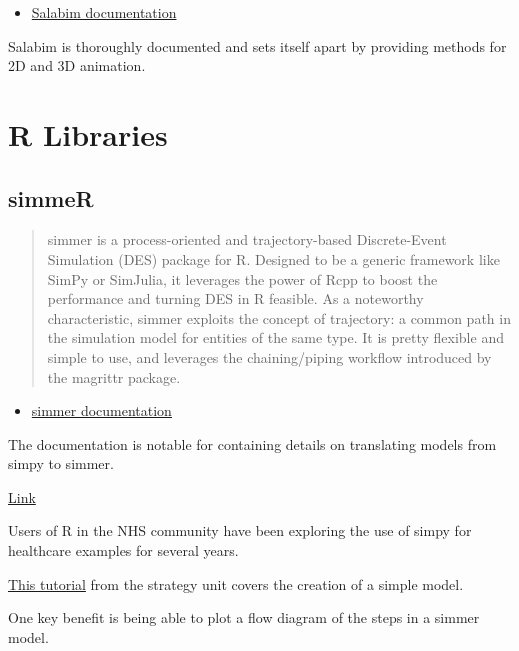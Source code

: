 \documentclass[
  letterpaper,
  DIV=11,
  numbers=noendperiod]{scrreprt}
\providecommand{\tightlist}{%
  \setlength{\itemsep}{0pt}\setlength{\parskip}{0pt}}\usepackage{longtable,booktabs,array}
\begin{document}
\begin{itemize}
\tightlist
\item
  \href{https://www.salabim.org/manual/Overview.html}{Salabim
  documentation}
\end{itemize}

Salabim is thoroughly documented and sets itself apart by providing
methods for 2D and 3D animation.

\section{R Libraries}\label{r-libraries}

\subsection{simmeR}\label{simmer}

\begin{quote}
simmer is a process-oriented and trajectory-based Discrete-Event
Simulation (DES) package for R. Designed to be a generic framework like
SimPy or SimJulia, it leverages the power of Rcpp to boost the
performance and turning DES in R feasible. As a noteworthy
characteristic, simmer exploits the concept of trajectory: a common path
in the simulation model for entities of the same type. It is pretty
flexible and simple to use, and leverages the chaining/piping workflow
introduced by the magrittr package.
\end{quote}

\begin{itemize}
\tightlist
\item
  \href{https://r-simmer.org/}{simmer documentation}
\end{itemize}

The documentation is notable for containing details on translating
models from simpy to simmer.

\href{https://r-simmer.org/articles/simmer-05-simpy}{Link}

Users of R in the NHS community have been exploring the use of simpy for
healthcare examples for several years.

\href{https://the-strategy-unit.github.io/des_simmer_workshop/}{This
tutorial} from the strategy unit covers the creation of a simple model.

One key benefit is being able to plot a flow diagram of the steps in a
simmer model.
\end{document}
